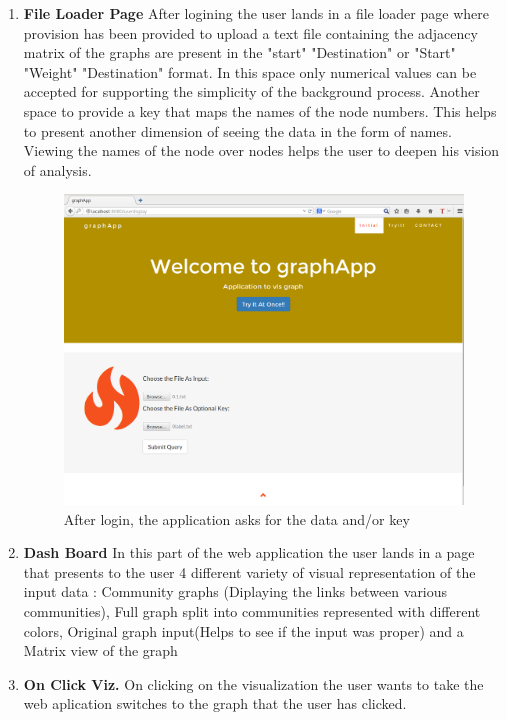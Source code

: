 \begin{enumerate}
\item \textbf{File Loader Page} After logining the user lands in a file loader page where provision has been provided to upload a text file containing the adjacency matrix of the graphs are present in the "start" "Destination" or "Start" "Weight" "Destination" format. In this space only numerical values can be accepted for supporting the simplicity of the background process. Another space to provide a key that maps the names of the node numbers. This helps to present another dimension of seeing the data in the form of names.  Viewing the names of the node over nodes helps the user to deepen his vision of analysis. 
\begin{figure}[H]
\centering
\includegraphics[scale=0.3]{s3.png}
\caption{After login, the application asks for the data and/or key }
\end{figure}


\item \textbf{Dash Board} In this part of the web application the user lands in a page that presents to the user 4 different variety of visual representation of the input data :  Community graphs (Diplaying the links between various communities), Full graph split into communities represented with different colors, Original graph input(Helps to see if the input was proper) and a Matrix view of the graph

\item \textbf{On Click Viz.} On clicking on the visualization the user wants to take the web aplication switches to the graph that the user has clicked.


\end{enumerate}
